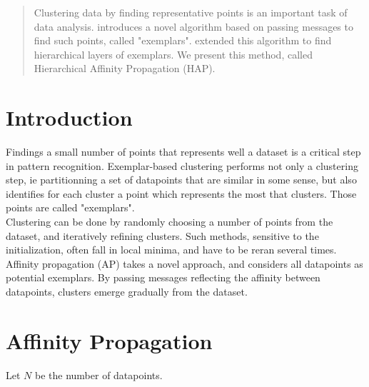\documentclass{ipol}
\begin{document}
\begin{abstract}

Clustering data by finding representative points is an important task of data
analysis. \cite{frey07affinitypropagation} introduces a novel algorithm based
on passing messages to find such points, called "exemplars". \cite{hap}
extended this algorithm to find hierarchical layers of exemplars. We present
this method, called Hierarchical Affinity Propagation (HAP).

\end{abstract}

\begin{ipolCode}
\end{ipolCode}

\begin{ipolSupp}
\end{ipolSupp}

\section{Introduction}

Findings a small number of points that represents well a dataset is a critical
step in pattern recognition. Exemplar-based clustering performs not only a
clustering step, ie partitionning a set of datapoints that are similar in some
sense, but also identifies for each cluster a point which represents the most
that clusters. Those points are called "exemplars". \\
Clustering can be done by randomly choosing a number of points from
the dataset, and iteratively refining clusters. Such methods, sensitive to the
initialization, often fall in local minima, and have to be reran several
times.\\
Affinity propagation (AP) takes a novel approach, and considers all datapoints
as potential exemplars. By passing messages reflecting the affinity between
datapoints, clusters emerge gradually from the dataset. \\

\section{Affinity Propagation}
Let $N$ be the number of datapoints.
\end{document}
